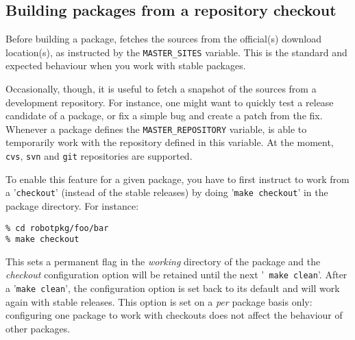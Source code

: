 

\subsection{Building packages from a repository checkout} %
\label{section:using:checkout}

Before building a  package, \robotpkg fetches the sources  from the official(s)
download  location(s),  as  instructed  by the  {\tt  MASTER\_SITES}  variable.
This is the standard and expected behaviour when you work with stable packages.

Occasionally, though,  it is useful to fetch  a snapshot of the  sources from a
development repository. For instance, one  might want to quickly test a release
candidate of a  package, or fix a simple  bug and create a patch  from the fix.
Whenever a package defines  the {\tt MASTER\_REPOSITORY} variable, \robotpkg is
able to temporarily  work with the repository defined in  this variable. At the
moment, {\tt cvs}, {\tt svn} and {\tt git} repositories are supported.

To enable this feature for a given package,  you have to first instruct
\robotpkg to work from a '{\tt checkout}' (instead of the stable releases) by
doing '{\tt make checkout}' in the package directory. For instance:

\begin{verbatim}
% cd robotpkg/foo/bar
% make checkout
\end{verbatim}

This sets  a permanent flag in the  {\em working} directory of  the package and
the {\em checkout}  configuration option will be retained  until the next '{\tt
make clean}'. After a '{\tt make  clean}', the configuration option is set back
to its default and \robotpkg will  work again with stable releases. This option
is set on a {\em per} package  basis only: configuring one package to work with
checkouts does not affect the behaviour of other packages.

